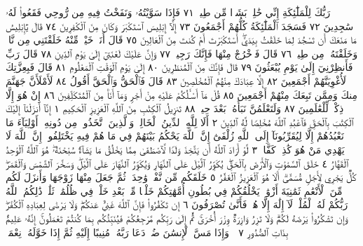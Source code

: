 رَبُّكَ لِلْمَلَٰٓئِكَةِ إِنِّي خَٰلِقُۢ بَشَرࣰا مِّن طِينࣲ ٧١ فَإِذَا سَوَّيْتُهُۥ وَنَفَخْتُ
فِيهِ مِن رُّوحِي فَقَعُوا۟ لَهُۥ سَٰجِدِينَ ٧٢ فَسَجَدَ ٱلْمَلَٰٓئِكَةُ كُلُّهُمْ
أَجْمَعُونَ ٧٣ إِلَّآ إِبْلِيسَ ٱسْتَكْبَرَ وَكَانَ مِنَ ٱلْكَٰفِرِينَ ٧٤ قَالَ
يَٰٓإِبْلِيسُ مَا مَنَعَكَ أَن تَسْجُدَ لِمَا خَلَقْتُ بِيَدَيَّۖ أَسْتَكْبَرْتَ أَمْ كُنتَ
مِنَ ٱلْعَالِينَ ٧٥ قَالَ أَنَا۠ خَيْرࣱ مِّنْهُ خَلَقْتَنِي مِن نَّارࣲ وَخَلَقْتَهُۥ مِن طِينࣲ ٧٦
قَالَ فَٱخْرُجْ مِنْهَا فَإِنَّكَ رَجِيمࣱ ٧٧ وَإِنَّ عَلَيْكَ لَعْنَتِيٓ إِلَىٰ يَوْمِ ٱلدِّينِ ٧٨
قَالَ رَبِّ فَأَنظِرْنِيٓ إِلَىٰ يَوْمِ يُبْعَثُونَ ٧٩ قَالَ فَإِنَّكَ مِنَ
ٱلْمُنظَرِينَ ٨٠ إِلَىٰ يَوْمِ ٱلْوَقْتِ ٱلْمَعْلُومِ ٨١ قَالَ فَبِعِزَّتِكَ
لَأُغْوِيَنَّهُمْ أَجْمَعِينَ ٨٢ إِلَّا عِبَادَكَ مِنْهُمُ ٱلْمُخْلَصِينَ ٨٣
قَالَ فَٱلْحَقُّ وَٱلْحَقَّ أَقُولُ ٨٤ لَأَمْلَأَنَّ جَهَنَّمَ مِنكَ وَمِمَّن تَبِعَكَ مِنْهُمْ
أَجْمَعِينَ ٨٥ قُلْ مَآ أَسْـَٔلُكُمْ عَلَيْهِ مِنْ أَجْرࣲ وَمَآ أَنَا۠ مِنَ ٱلْمُتَكَلِّفِينَ ٨٦
إِنْ هُوَ إِلَّا ذِكْرࣱ لِّلْعَٰلَمِينَ ٨٧ وَلَتَعْلَمُنَّ نَبَأَهُۥ بَعْدَ حِينِۭ ٨٨
تَنزِيلُ ٱلْكِتَٰبِ مِنَ ٱللَّهِ ٱلْعَزِيزِ ٱلْحَكِيمِ ١ إِنَّآ أَنزَلْنَآ إِلَيْكَ
ٱلْكِتَٰبَ بِٱلْحَقِّ فَٱعْبُدِ ٱللَّهَ مُخْلِصࣰا لَّهُ ٱلدِّينَ ٢ أَلَا
لِلَّهِ ٱلدِّينُ ٱلْخَالِصُۚ وَٱلَّذِينَ ٱتَّخَذُوا۟ مِن دُونِهِۦٓ أَوْلِيَآءَ
مَا نَعْبُدُهُمْ إِلَّا لِيُقَرِّبُونَآ إِلَى ٱللَّهِ زُلْفَىٰٓ إِنَّ ٱللَّهَ يَحْكُمُ
بَيْنَهُمْ فِي مَا هُمْ فِيهِ يَخْتَلِفُونَۗ إِنَّ ٱللَّهَ لَا يَهْدِي مَنْ هُوَ
كَٰذِبࣱ كَفَّارࣱ ٣ لَّوْ أَرَادَ ٱللَّهُ أَن يَتَّخِذَ وَلَدࣰا لَّٱصْطَفَىٰ
مِمَّا يَخْلُقُ مَا يَشَآءُۚ سُبْحَٰنَهُۥۖ هُوَ ٱللَّهُ ٱلْوَٰحِدُ ٱلْقَهَّارُ ٤
خَلَقَ ٱلسَّمَٰوَٰتِ وَٱلْأَرْضَ بِٱلْحَقِّۖ يُكَوِّرُ ٱلَّيْلَ عَلَى
ٱلنَّهَارِ وَيُكَوِّرُ ٱلنَّهَارَ عَلَى ٱلَّيْلِۖ وَسَخَّرَ ٱلشَّمْسَ وَٱلْقَمَرَۖ
كُلࣱّ يَجْرِي لِأَجَلࣲ مُّسَمًّىۗ أَلَا هُوَ ٱلْعَزِيزُ ٱلْغَفَّٰرُ ٥
خَلَقَكُم مِّن نَّفْسࣲ وَٰحِدَةࣲ ثُمَّ جَعَلَ مِنْهَا زَوْجَهَا وَأَنزَلَ لَكُم
مِّنَ ٱلْأَنْعَٰمِ ثَمَٰنِيَةَ أَزْوَٰجࣲۚ يَخْلُقُكُمْ فِي بُطُونِ أُمَّهَٰتِكُمْ
خَلْقࣰا مِّنۢ بَعْدِ خَلْقࣲ فِي ظُلُمَٰتࣲ ثَلَٰثࣲۚ ذَٰلِكُمُ ٱللَّهُ رَبُّكُمْ لَهُ
ٱلْمُلْكُۖ لَآ إِلَٰهَ إِلَّا هُوَۖ فَأَنَّىٰ تُصْرَفُونَ ٦ إِن تَكْفُرُوا۟ فَإِنَّ
ٱللَّهَ غَنِيٌّ عَنكُمْۖ وَلَا يَرْضَىٰ لِعِبَادِهِ ٱلْكُفْرَۖ وَإِن تَشْكُرُوا۟ يَرْضَهُ
لَكُمْۗ وَلَا تَزِرُ وَازِرَةࣱ وِزْرَ أُخْرَىٰۚ ثُمَّ إِلَىٰ رَبِّكُم مَّرْجِعُكُمْ
فَيُنَبِّئُكُم بِمَا كُنتُمْ تَعْمَلُونَۚ إِنَّهُۥ عَلِيمُۢ بِذَاتِ ٱلصُّدُورِ ٧
۞ وَإِذَا مَسَّ ٱلْإِنسَٰنَ ضُرࣱّ دَعَا رَبَّهُۥ مُنِيبًا إِلَيْهِ ثُمَّ إِذَا خَوَّلَهُۥ نِعْمَةࣰ
